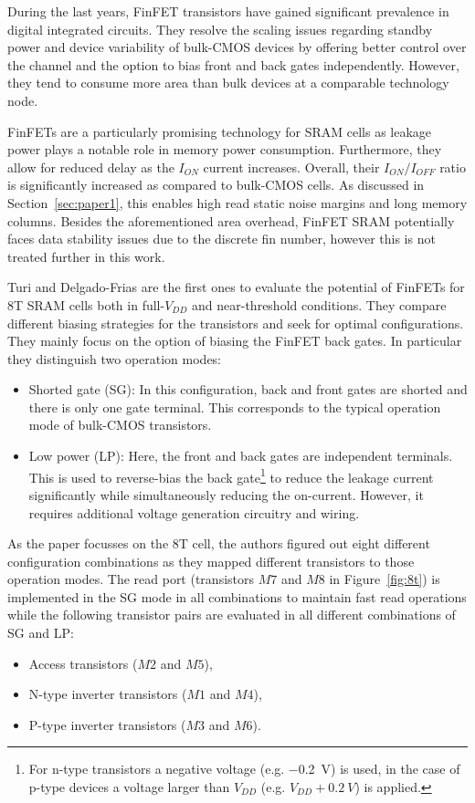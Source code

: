 \documentclass[conference]{IEEEtran}
\begin{document}
During the last years, FinFET transistors have gained significant prevalence in digital integrated circuits. They resolve the scaling issues regarding standby power and device variability of bulk-CMOS devices by offering better control over the channel and the option to bias front and back gates independently. However, they tend to consume more area than bulk devices at a comparable technology node.

FinFETs are a particularly promising technology for SRAM cells as leakage power plays a notable role in memory power consumption. Furthermore, they allow for reduced delay as the $I_{ON}$ current increases. Overall, their $I_{ON}/I_{OFF}$ ratio is significantly increased as compared to bulk-CMOS cells. As discussed in Section~\ref{sec:paper1}, this enables high read static noise margins and long memory columns. Besides the aforementioned area overhead, FinFET SRAM potentially faces data stability issues due to the discrete fin number, however this is not treated further in this work.

Turi and Delgado-Frias \cite{Turi2017} are the first ones to evaluate the potential of FinFETs for 8T SRAM cells both in full-$V_{DD}$ and near-threshold conditions. They compare different biasing strategies for the transistors and seek for optimal configurations. They mainly focus on the option of biasing the FinFET back gates. In particular they distinguish two operation modes:

\begin{itemize}
	\item Shorted gate (SG): In this configuration, back and front gates are shorted and there is only one gate terminal. This corresponds to the typical operation mode of bulk-CMOS transistors.
	\item Low power (LP): Here, the front and back gates are independent terminals. This is used to reverse-bias the back gate\footnote{For n-type transistors a negative voltage (e.g. \SI{-0.2}{V}) is used, in the case of p-type devices a voltage larger than $V_{DD}$ (e.g. $V_{DD} + \SI{0.2}{V}$) is applied.} to reduce the leakage current significantly while simultaneously reducing the on-current. However, it requires additional voltage generation circuitry and wiring.
\end{itemize}

As the paper focusses on the 8T cell, the authors figured out eight different configuration combinations as they mapped different transistors to those operation modes. The read port (transistors $M7$ and $M8$ in Figure~\ref{fig:8t}) is implemented in the SG mode in all combinations to maintain fast read operations while the following transistor pairs are evaluated in all different combinations of SG and LP:
\begin{itemize}
	\item Access transistors ($M2$ and $M5$),
	\item N-type inverter transistors ($M1$ and $M4$),
	\item P-type inverter transistors ($M3$ and $M6$).
\end{itemize}
\end{document}

